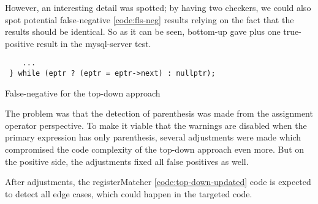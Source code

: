 However, an interesting detail was spotted; by having two checkers, we could also spot potential false-negative \ref{code:fls-neg} results relying on the fact that the results should be identical. So as it can be seen, bottom-up gave plus one true-positive result in the mysql-server test. 

\begin{listing}[h]
\begin{verbatim}
    ... 
 } while (eptr ? (eptr = eptr->next) : nullptr);
\end{verbatim}
\caption{False-negative for the top-down approach}
\label{code:fls-neg}
\end{listing}

The problem was that the detection of parenthesis was made from the assignment operator perspective. To make it viable that the warnings are disabled when the primary expression has only parenthesis, several adjustments were made which compromised the code complexity of the top-down approach even more. But on the positive side, the adjustments fixed all false positives as well.

After adjustments, the registerMatcher \ref{code:top-down-updated} code is expected to detect all edge cases, which could happen in the targeted code. \\\\\\\\

